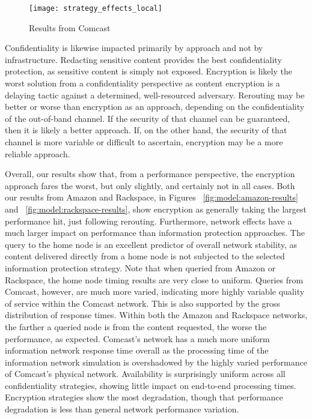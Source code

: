 \begin{figure}[!t]
\centering
\texttt{[image: strategy\_effects\_local]}
\caption{Results from Comcast}
\label{fig:model:comcast-results}
\end{figure}

Confidentiality is likewise impacted primarily by approach and not by infrastructure.  Redacting sensitive content provides the best confidentiality protection, as sensitive content is simply not exposed.  Encryption is likely the worst solution from a confidentiality perspective as content encryption is a delaying tactic against a determined, well-resourced adversary.  Rerouting may be better or worse than encryption as an approach, depending on the confidentiality of the out-of-band channel.  If the security of that channel can be guaranteed, then it is likely a better approach.  If, on the other hand, the security of that channel is more variable or difficult to ascertain, encryption may be a more reliable approach.

Overall, our results show that, from a performance perspective, the encryption approach fares the worst, but only slightly, and certainly not in all cases.  Both our results from Amazon and Rackspace, in Figures ~\ref{fig:model:amazon-results} and ~\ref{fig:model:rackspace-results}, show encryption as generally taking the largest performance hit, just following rerouting.
Furthermore, network effects have a much larger impact on performance than information protection approaches.  The query to the home node is an excellent predictor of overall network stability, as content delivered directly from a home node is not subjected to the selected information protection strategy.  Note that when queried from Amazon or Rackspace, the home node timing results are very close to uniform.  Queries from Comcast, however, are much more varied, indicating more highly variable quality of service within the Comcast network.  This is also supported by the gross distribution of response times.  Within both the Amazon and Rackspace networks, the farther a queried node is from the content requested, the worse the performance, as expected.  Comcast's network has a much more uniform information network response time overall as the processing time of the information network simulation is overshadowed by the highly varied performance of Comcast's physical network.  Availability is surprisingly uniform across all confidentiality strategies, showing little impact on end-to-end processing times.  Encryption strategies show the most degradation, though that performance degradation is less than general network performance variation.

